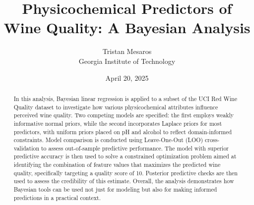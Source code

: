 \documentclass[12pt]{article}
\title{\textbf{Physicochemical Predictors of Wine Quality: A Bayesian Analysis}}
\author{Tristan Mesaros \\[0.5cm] Georgia Institute of Technology}
\date{April 20, 2025}
\begin{document}
\maketitle

\begin{abstract}
In this analysis, Bayesian linear regression is applied to a subset of the UCI Red Wine Quality dataset to investigate how various physicochemical attributes influence perceived wine quality. Two competing models are specified: the first employs weakly informative normal priors, while the second incorporates Laplace priors for most predictors, with uniform priors placed on pH and alcohol to reflect domain-informed constraints. Model comparison is conducted using Leave-One-Out (LOO) cross-validation to assess out-of-sample predictive performance. The model with superior predictive accuracy is then used to solve a constrained optimization problem aimed at identifying the combination of feature values that maximizes the predicted wine quality, specifically targeting a quality score of 10. Posterior predictive checks are then used to assess the credibility of this estimate. Overall, the analysis demonstrates how Bayesian tools can be used not just for modeling but also for making informed predictions in a practical context.
\end{abstract}

\newpage
\end{document}
